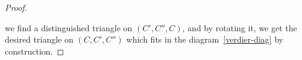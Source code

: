 \begin{ex}[Verdier]
\begin{proof}
\begin{center}
        \end{center}
        we find a distinguished triangle on $(C',C'',C)$,
        and by rotating it, we get the desired triangle
        on $(C,C',C'')$ which fits in the diagram~\eqref{verdier-diag}
        by construction.
    \end{proof}
\end{ex}